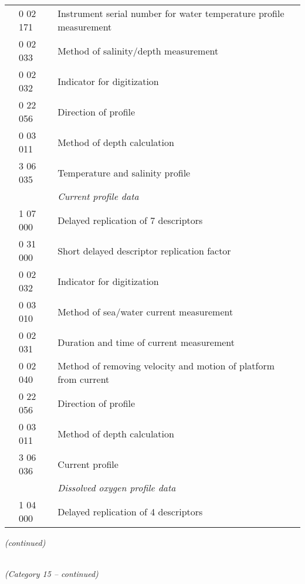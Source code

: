 \begin{longtable}[]{@{}llll@{}}
& 0 02 171 & Instrument serial number for water temperature profile measurement &\tabularnewline
& 0 02 033 & Method of salinity/depth measurement &\tabularnewline
& 0 02 032 & Indicator for digitization &\tabularnewline
& 0 22 056 & Direction of profile &\tabularnewline
& 0 03 011 & Method of depth calculation &\tabularnewline
& 3 06 035 & Temperature and salinity profile &\tabularnewline
& & \emph{Current profile data} &\tabularnewline
& 1 07 000 & Delayed replication of 7 descriptors &\tabularnewline
& 0 31 000 & Short delayed descriptor replication factor &\tabularnewline
& 0 02 032 & Indicator for digitization &\tabularnewline
& 0 03 010 & Method of sea/water current measurement &\tabularnewline
& 0 02 031 & Duration and time of current measurement &\tabularnewline
& 0 02 040 & Method of removing velocity and motion of platform from current &\tabularnewline
& 0 22 056 & Direction of profile &\tabularnewline
& 0 03 011 & Method of depth calculation &\tabularnewline
& 3 06 036 & Current profile &\tabularnewline
& & \emph{Dissolved oxygen profile data} &\tabularnewline
& 1 04 000 & Delayed replication of 4 descriptors &\tabularnewline
\bottomrule
\end{longtable}

\emph{(continued)}

\emph{\\
(Category 15 -- continued)}

